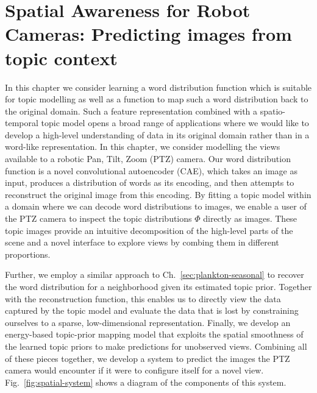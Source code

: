 
\chapter{Spatial Awareness for Robot Cameras: Predicting images from topic context} \label{ch:spatial-prediction}

In this chapter we consider learning a word distribution function which is suitable for topic modelling as well as a function to map such a word distribution back to the original domain. Such a feature representation combined with a spatio-temporal topic model opens a broad range of applications where we would like to develop a high-level understanding of data in its original domain rather than in a word-like representation. In this chapter, we consider modelling the views available to a robotic Pan, Tilt, Zoom (PTZ) camera. Our word distribution function is a novel convolutional autoencoder (CAE), which takes an image as input, produces a distribution of words as its encoding, and then attempts to reconstruct the original image from this encoding. By fitting a topic model within a domain where we can decode word distributions to images, we enable a user of the PTZ camera to inspect the topic distributions $\Phi$ directly as images. These topic images provide an intuitive decomposition of the high-level parts of the scene and a novel interface to explore views by combing them in different proportions.

Further, we employ a similar approach to Ch.~\ref{sec:plankton-seasonal} to recover the word distribution for a neighborhood given its estimated topic prior. Together with the reconstruction function, this enables us to directly view the data captured by the topic model and evaluate the data that is lost by constraining ourselves to a sparse, low-dimensional representation. Finally, we develop an energy-based topic-prior mapping model that exploits the spatial smoothness of the learned topic priors to make predictions for unobserved views. Combining all of these pieces together, we develop a system to predict the images the PTZ camera would encounter if it were to configure itself for a novel view. Fig.~\ref{fig:spatial-system} shows a diagram of the components of this system.

